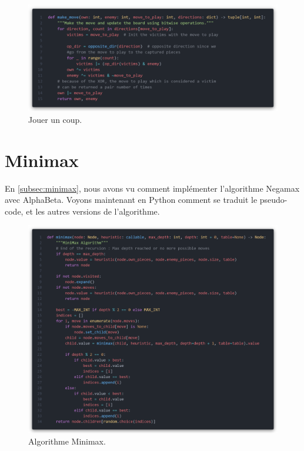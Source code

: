 \begin{figure}[H]
    \centering
    \includegraphics[width=1\textwidth]{ressources/make_move.png}
    \caption{Jouer un coup.}
    \label{fig:make_move}
\end{figure}

\section{Minimax}
\label{app:minimax}

En \ref{subsec:minimax}, nous avons vu comment implémenter l'algorithme Negamax avec AlphaBeta. Voyons maintenant en Python comment se traduit le pseudo-code, et les autres versions de l'algorithme.

\begin{figure}[H]
    \centering
    \includegraphics[width=1\textwidth]{ressources/minimax.png}
    \caption{Algorithme Minimax.}
    \label{fig:minimax}
\end{figure}


